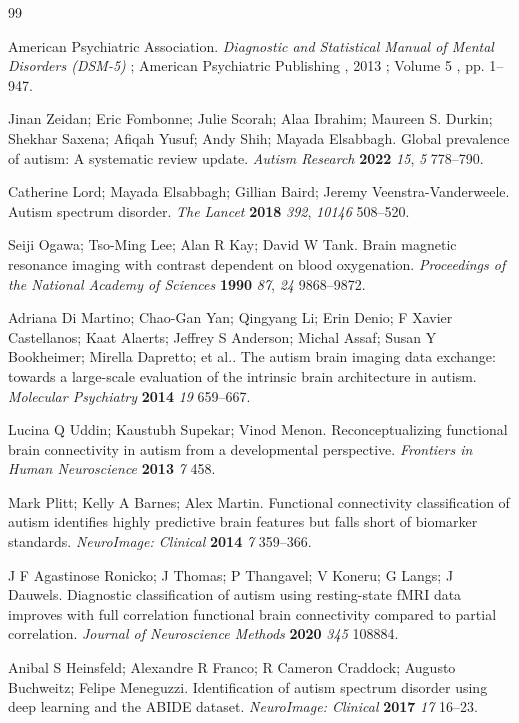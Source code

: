 
\begin{thebibliography}{99}

American Psychiatric Association. \textit{Diagnostic and Statistical Manual of Mental Disorders (DSM-5)} ; American Psychiatric Publishing , 2013 ; Volume 5 , pp. 1--947.

Jinan Zeidan; Eric Fombonne; Julie Scorah; Alaa Ibrahim; Maureen S. Durkin; Shekhar Saxena; Afiqah Yusuf; Andy Shih; Mayada Elsabbagh. Global prevalence of autism: A systematic review update. \textit{Autism Research} \textbf{2022} \textit{15}, \textit{5} 778--790.

Catherine Lord; Mayada Elsabbagh; Gillian Baird; Jeremy Veenstra-Vanderweele. Autism spectrum disorder. \textit{The Lancet} \textbf{2018} \textit{392}, \textit{10146} 508--520.

Seiji Ogawa; Tso-Ming Lee; Alan R Kay; David W Tank. Brain magnetic resonance imaging with contrast dependent on blood oxygenation. \textit{Proceedings of the National Academy of Sciences} \textbf{1990} \textit{87}, \textit{24} 9868--9872.

Adriana Di Martino; Chao-Gan Yan; Qingyang Li; Erin Denio; F Xavier Castellanos; Kaat Alaerts; Jeffrey S Anderson; Michal Assaf; Susan Y Bookheimer; Mirella Dapretto; et al.. The autism brain imaging data exchange: towards a large-scale evaluation of the intrinsic brain architecture in autism. \textit{Molecular Psychiatry} \textbf{2014} \textit{19} 659--667.

Lucina Q Uddin; Kaustubh Supekar; Vinod Menon. Reconceptualizing functional brain connectivity in autism from a developmental perspective. \textit{Frontiers in Human Neuroscience} \textbf{2013} \textit{7} 458.

Mark Plitt; Kelly A Barnes; Alex Martin. Functional connectivity classification of autism identifies highly predictive brain features but falls short of biomarker standards. \textit{NeuroImage: Clinical} \textbf{2014} \textit{7} 359--366.

J F Agastinose Ronicko; J Thomas; P Thangavel; V Koneru; G Langs; J Dauwels. Diagnostic classification of autism using resting-state fMRI data improves with full correlation functional brain connectivity compared to partial correlation. \textit{Journal of Neuroscience Methods} \textbf{2020} \textit{345} 108884.

Anibal S Heinsfeld; Alexandre R Franco; R Cameron Craddock; Augusto Buchweitz; Felipe Meneguzzi. Identification of autism spectrum disorder using deep learning and the ABIDE dataset. \textit{NeuroImage: Clinical} \textbf{2017} \textit{17} 16--23.


\end{thebibliography}
